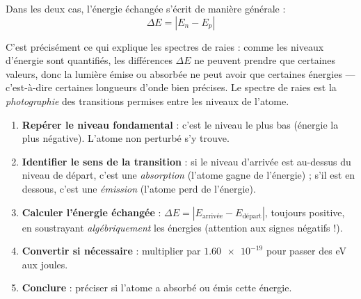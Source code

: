 \documentclass[11pt]{article}
\begin{document}
Dans les deux cas, l'énergie échangée s'écrit de manière générale :
\[ \Delta E = |E_n - E_p| \]

C'est précisément ce qui explique les spectres de raies : comme les niveaux d'énergie sont quantifiés, les différences $\Delta E$ ne peuvent prendre que certaines valeurs, donc la lumière émise ou absorbée ne peut avoir que certaines énergies — c'est-à-dire certaines longueurs d'onde bien précises. Le spectre de raies est la \emph{photographie} des transitions permises entre les niveaux de l'atome.

\begin{methode}
\begin{enumerate}
\item \textbf{Repérer le niveau fondamental} : c'est le niveau le plus bas (énergie la plus négative). L'atome non perturbé s'y trouve.
\item \textbf{Identifier le sens de la transition} : si le niveau d'arrivée est au-dessus du niveau de départ, c'est une \emph{absorption} (l'atome gagne de l'énergie) ; s'il est en dessous, c'est une \emph{émission} (l'atome perd de l'énergie).
\item \textbf{Calculer l'énergie échangée} : $\Delta E = |E_{\text{arrivée}} - E_{\text{départ}}|$, toujours positive, en soustrayant \emph{algébriquement} les énergies (attention aux signes négatifs !).
\item \textbf{Convertir si nécessaire} : multiplier par $\num{1,60e-19}$ pour passer des eV aux joules.
\item \textbf{Conclure} : préciser si l'atome a absorbé ou émis cette énergie.
\end{enumerate}
\end{methode}
\end{document}
